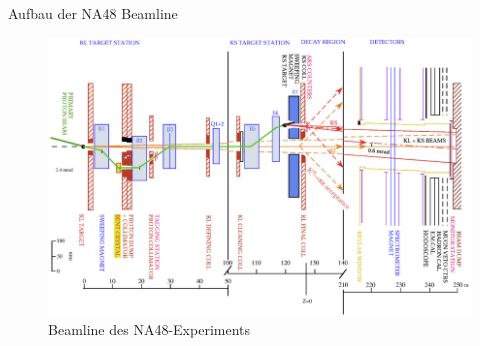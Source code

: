 \documentclass[aspectratio=1610, professionalfonts, 9pt, t]{beamer}
\begin{document}
  \begin{frame}{Aufbau der NA48 Beamline}
    \begin{figure}[ht]
      \includegraphics[height=0.95\textheight]{Images/na48quer.png}
      \caption{Beamline des NA48-Experiments}
    \end{figure}
  \end{frame}
\end{document}
